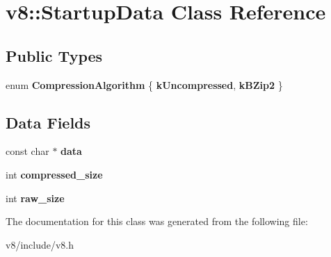 \hypertarget{classv8_1_1StartupData}{\section{v8\-:\-:Startup\-Data Class Reference}
\label{classv8_1_1StartupData}
}
\subsection*{Public Types}
\begin{DoxyCompactItemize}
\item 
enum {\bfseries Compression\-Algorithm} \{ {\bfseries k\-Uncompressed}, 
{\bfseries k\-B\-Zip2}
 \}
\end{DoxyCompactItemize}
\subsection*{Data Fields}
\begin{DoxyCompactItemize}
\item 
\hypertarget{classv8_1_1StartupData_a8daf0c5282d7c465988757dc4ecda1af}{const char $\ast$ {\bfseries data}}\label{classv8_1_1StartupData_a8daf0c5282d7c465988757dc4ecda1af}

\item 
\hypertarget{classv8_1_1StartupData_a8037d1138d46d3977384c0e056ea5920}{int {\bfseries compressed\-\_\-size}}\label{classv8_1_1StartupData_a8037d1138d46d3977384c0e056ea5920}

\item 
\hypertarget{classv8_1_1StartupData_a2f797e167b2bebd18ddca83dedda6ffa}{int {\bfseries raw\-\_\-size}}\label{classv8_1_1StartupData_a2f797e167b2bebd18ddca83dedda6ffa}

\end{DoxyCompactItemize}


The documentation for this class was generated from the following file\-:\begin{DoxyCompactItemize}
\item 
v8/include/v8.\-h\end{DoxyCompactItemize}
